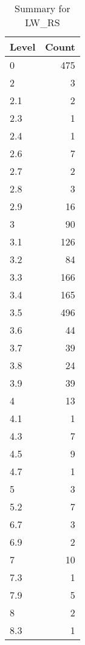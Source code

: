 \begin{table}[ht]
\centering
\begin{tabular}{lr}
  \hline
Level & Count \\ 
  \hline
0 & 475 \\ 
  2 &   3 \\ 
  2.1 &   2 \\ 
  2.3 &   1 \\ 
  2.4 &   1 \\ 
  2.6 &   7 \\ 
  2.7 &   2 \\ 
  2.8 &   3 \\ 
  2.9 &  16 \\ 
  3 &  90 \\ 
  3.1 & 126 \\ 
  3.2 &  84 \\ 
  3.3 & 166 \\ 
  3.4 & 165 \\ 
  3.5 & 496 \\ 
  3.6 &  44 \\ 
  3.7 &  39 \\ 
  3.8 &  24 \\ 
  3.9 &  39 \\ 
  4 &  13 \\ 
  4.1 &   1 \\ 
  4.3 &   7 \\ 
  4.5 &   9 \\ 
  4.7 &   1 \\ 
  5 &   3 \\ 
  5.2 &   7 \\ 
  6.7 &   3 \\ 
  6.9 &   2 \\ 
  7 &  10 \\ 
  7.3 &   1 \\ 
  7.9 &   5 \\ 
  8 &   2 \\ 
  8.3 &   1 \\ 
   \hline
\end{tabular}
\caption{Summary for LW_RS} 
\label{tab: LW_RS}
\end{table}
